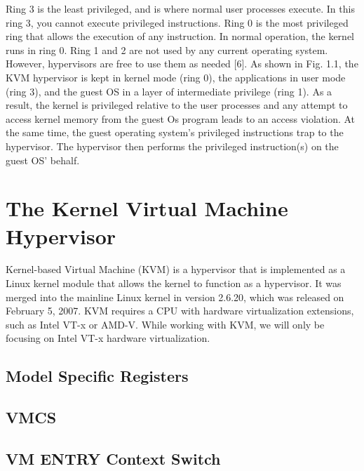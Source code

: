 \documentclass{report}
\begin{document}
\begin{spacing}{1.5}
{\begin{figure}[!h]
\begin{center}
\begin{tikzpicture}
\end{tikzpicture}
\end{center}
\end{figure}
}

{\large
Ring 3 is the least privileged, and is where normal user processes execute. In this ring 3, you cannot execute privileged instructions. Ring 0 is the most privileged ring that allows the execution of any instruction. In normal operation, the kernel runs in ring 0. Ring 1 and 2 are not used by any current operating system. However, hypervisors are free to use them as needed [6]. As shown in Fig. 1.1, the KVM hypervisor is kept in kernel mode (ring 0), the applications in user mode (ring 3), and the guest OS in a layer of intermediate privilege (ring 1). As a result, the kernel is privileged relative to the user processes and any attempt to access kernel memory from the guest Os program leads to an access violation. At the same time, the guest operating system’s privileged instructions trap to the hypervisor. The hypervisor then performs the privileged instruction(s) on the guest OS' behalf.
\newline
}




\section{The Kernel Virtual Machine Hypervisor}


{\large 
Kernel-based Virtual Machine (KVM) is a hypervisor that is implemented as a Linux kernel module that allows the kernel to function as a hypervisor. It was merged into the mainline Linux kernel in version 2.6.20, which was released on February 5, 2007. KVM requires a CPU with hardware virtualization extensions, such as Intel VT-x or AMD-V. While working with KVM, we will only be focusing on Intel VT-x hardware virtualization.
\newline
}



\subsection{Model Specific Registers}
\subsection{VMCS}
\subsection{VM ENTRY Context Switch}

\end{spacing}
\end{document}
